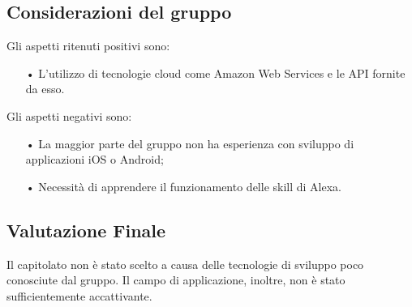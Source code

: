 \subsection{Considerazioni del gruppo}
Gli aspetti ritenuti positivi sono:
\begin{itemize}

\item[•] L'utilizzo di tecnologie cloud come Amazon Web Services e le API fornite da esso.

\end{itemize}

Gli aspetti negativi sono: 
\begin{itemize}

\item[•] La maggior parte del gruppo non ha esperienza con sviluppo di applicazioni iOS o Android;
\item[•] Necessità di apprendere il funzionamento delle skill di Alexa.

\end{itemize}

\subsection{Valutazione Finale}
Il capitolato non è stato scelto a causa delle tecnologie di sviluppo poco conosciute dal gruppo. Il campo di applicazione, inoltre, non è stato sufficientemente accattivante.
